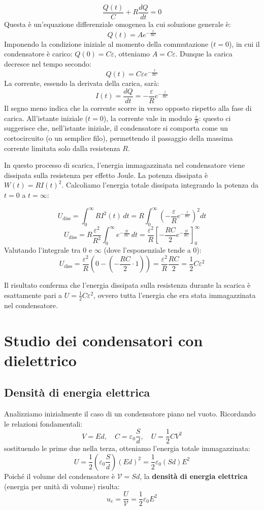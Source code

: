 \documentclass{book}
\begin{document}
$$
\frac{Q(t)}{C} + R \frac{dQ}{dt} = 0
$$
Questa è un'equazione differenziale omogenea la cui soluzione generale è:
$$
Q(t) = A e^{-\frac{t}{RC}}
$$
Imponendo la condizione iniziale al momento della commutazione ($t=0$), in cui il condensatore è carico: $Q(0) = C\varepsilon$, otteniamo $A = C\varepsilon$.
Dunque la carica decresce nel tempo secondo:
$$
Q(t) = C\varepsilon e^{-\frac{t}{RC}}
$$
La corrente, essendo la derivata della carica, sarà:
$$
I(t) = \frac{dQ}{dt} = -\frac{\varepsilon}{R} e^{-\frac{t}{RC}}
$$
Il segno meno indica che la corrente scorre in verso opposto rispetto alla fase di carica.
All'istante iniziale ($t=0$), la corrente vale in modulo $\frac{\varepsilon}{R}$: questo ci suggerisce che, nell'istante iniziale, il condensatore si comporta come un cortocircuito (o un semplice filo), permettendo il passaggio della massima corrente limitata solo dalla resistenza $R$.

In questo processo di scarica, l'energia immagazzinata nel condensatore viene dissipata sulla resistenza per effetto Joule. La potenza dissipata è $W(t) = R I(t)^2$.
Calcoliamo l'energia totale dissipata integrando la potenza da $t=0$ a $t=\infty$:

$$
U_{\text{diss}} = \int_0^\infty R I^2(t) \, dt = R \int_0^\infty \left( -\frac{\varepsilon}{R} e^{-\frac{t}{RC}} \right)^2 dt
$$
$$
U_{\text{diss}} = R \frac{\varepsilon^2}{R^2} \int_0^\infty e^{-\frac{2t}{RC}} \, dt = \frac{\varepsilon^2}{R} \left[ -\frac{RC}{2} e^{-\frac{2t}{RC}} \right]_0^\infty
$$
Valutando l'integrale tra $0$ e $\infty$ (dove l'esponenziale tende a 0):
$$
U_{\text{diss}} = \frac{\varepsilon^2}{R} \left( 0 - \left( -\frac{RC}{2} \cdot 1 \right) \right) = \frac{\varepsilon^2}{R} \frac{RC}{2} = \frac{1}{2} C \varepsilon^2
$$

Il risultato conferma che l'energia dissipata sulla resistenza durante la scarica è esattamente pari a $U = \frac{1}{2} C \varepsilon^2$, ovvero tutta l'energia che era stata immagazzinata nel condensatore.


\section{Studio dei condensatori con dielettrico}

\subsection{Densit\`a di energia elettrica}
Analizziamo inizialmente il caso di un condensatore piano nel vuoto. Ricordando le relazioni fondamentali:
$$
V=Ed, \quad C=\varepsilon_0\frac{S}{d}, \quad U=\frac{1}{2}CV^2
$$
sostituendo le prime due nella terza, otteniamo l'energia totale immagazzinata:
$$
U= \frac{1}{2}\left(\varepsilon_0\frac{S}{d}\right)(Ed)^2 = \frac{1}{2}\varepsilon_0 (Sd) E^2
$$
Poiché il volume del condensatore è $\mathcal{V} = Sd$, la \textbf{densità di energia elettrica} (energia per unità di volume) risulta:
$$
u_e = \frac{U}{\mathcal{V}} = \frac{1}{2}\varepsilon_0 E^2
$$
\end{document}
